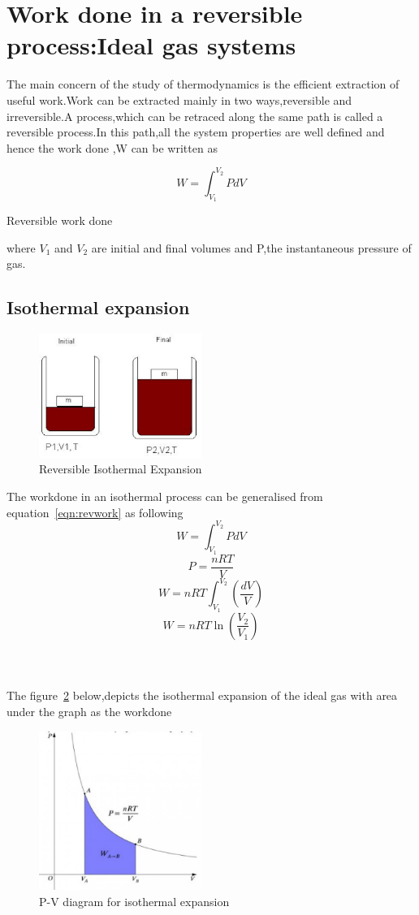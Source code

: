 \section{Work done in a reversible process:Ideal gas  systems}
The main concern of the study of thermodynamics is the efficient extraction of useful work.Work can be extracted mainly in two ways,reversible and irreversible.A process,which can be retraced along the same path is called a reversible process.In this path,all the system properties are well defined and hence the work done ,W can be written as

\begin{equation}
	W=\int_{V_1}^{V_2}{PdV}
	\label{eqn:revwork}
\end{equation}
\begin{center}
Reversible work done ~\cite{fleming_me027}
\end{center}
where $V_1$ and $V_2$ are initial and final volumes and P,the instantaneous pressure of gas.

\subsection{Isothermal expansion}
\begin{figure}[h]
	\begin{center}
		\includegraphics[width=200px]{me20b027a.eps}
	\end{center}
	\caption{Reversible Isothermal Expansion~\cite{libtex_me027}}
	\label{fig:revexp}
\end{figure}
The workdone in an isothermal process can be generalised from equation~\ref{eqn:revwork} as following
$$W=\int_{V_1}^{V_2}{PdV}$$
$$P=\frac{nRT}{V}$$
$$W=nRT\int_{V_1}^{V_2}{\left(\frac{dV}{V}\right)}$$
\begin{equation}
	W=nRT\ln\left(\frac{V_2}{V_1}\right)
\end{equation}
\\\\\\
The figure~\ref{gr:istexp} below,depicts the isothermal expansion of the ideal gas with area under the graph as the workdone

\begin{figure}[h]
	\begin{center}
		\includegraphics[width=200px]{me20b027b.eps}
	\end{center}
	\caption{P-V diagram for isothermal expansion~\cite{donev_me027}}
	\label{gr:istexp}
\end{figure}
